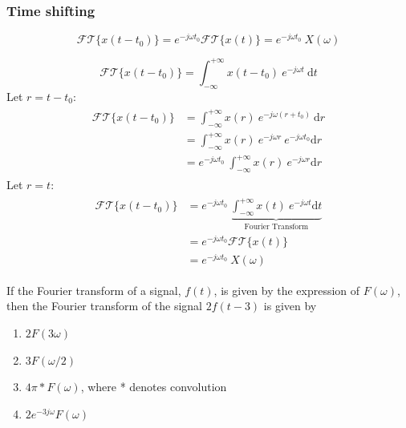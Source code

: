 \subsubsection{Time shifting}
\[ \mathcal{FT} \{ x(t-t_{0}) \} = e^{-j \omega t_{0}}\mathcal{FT} \{ x(t)\} = e^{-j \omega t_{0}} \ X(\omega) \]
\begin{dv}{}
    \[ \mathcal{FT} \{ x(t-t_{0}) \} =  \int_{-\infty}^{+\infty} x(t-t_{0}) \ e^{-j \omega t} \ \mathrm{d}t\] 
    Let $r = t - t_{0}$:
    \begin{align*}
    \begin{split}
        \mathcal{FT} \{ x(t-t_{0}) \} &=  \int_{-\infty}^{+\infty} x(r) \ e^{-j \omega (r+t_{0})} \ \mathrm{d}r\\
        &= \int_{-\infty}^{+\infty} x(r) \ e^{-j \omega r} \ e^{-j \omega t_{0}} \mathrm{d}r \\
        &= e^{-j \omega t_{0}} \ \int_{-\infty}^{+\infty} x(r) \ e^{-j \omega r}\mathrm{d}r 
    \end{split} 
    \end{align*}
    Let $r = t$:
    \begin{align*}
    \begin{split}
        \mathcal{FT} \{ x(t-t_{0}) \} &= e^{-j \omega t_{0}} \ \underbrace{\int_{-\infty}^{+\infty} x(t) \ e^{-j \omega t} \mathrm{d}t}_{\text{Fourier Transform}}\\
        & = e^{-j \omega t_{0}}\mathcal{FT} \{ x(t)\}\\
        &=e^{-j \omega t_{0}} \ X(\omega)
    \end{split} 
    \end{align*}
\end{dv}
\begin{q}{}
If the Fourier transform of a signal, $f(t)$, is given by the expression of $F(\omega)$, then the Fourier transform of the signal $2f(t-3)$ is given by

\begin{enumerate}[label=(\alph*)]
    \item $2F(3\omega)$
    \item $3F(\omega/2)$
    \item $4\pi * F(\omega)$, where * denotes convolution
    \item $2e^{-3j\omega}F(\omega)$
\end{enumerate} 
\end{q}
